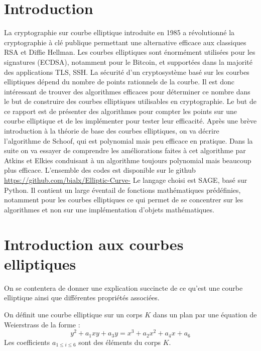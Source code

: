 \documentclass[12pt]{article}
\begin{document}
\section{Introduction}
La cryptographie sur courbe elliptique introduite en 1985 a révolutionné la cryptographie à clé publique permettant une alternative efficace aux classiques RSA et Diffie Hellman. Les courbes elliptiques sont énormément utilisées pour les signatures (ECDSA), notamment pour le Bitcoin, et supportées dans la majorité des applications TLS, SSH. La sécurité d'un cryptosystème basé sur les courbes elliptiques dépend du nombre de points rationnels de la courbe. Il est donc intéressant de trouver des algorithmes efficaces pour déterminer ce nombre dans le but de construire des courbes elliptiques utilisables en cryptographie.
\newline
Le but de ce rapport est de présenter des algorithmes pour compter les points sur une courbe elliptique et de les implémenter pour tester leur efficacité. Après une brève introduction à la théorie de base des courbes elliptiques, on va décrire l'algorithme de Schoof, qui est polynomial mais peu efficace en pratique. Dans la suite on va essayer de comprendre les améliorations faites à cet algorithme par Atkins et Elkies conduisant à un algorithme toujours polynomial mais beaucoup plus efficace.
\newline
L'ensemble des codes est disponible sur le github \url{https://github.com/bialx/Elliptic-Curve-} Le langage choisi est SAGE, basé sur Python. Il contient un large éventail de fonctions mathématiques prédéfinies, notamment pour les courbes elliptiques ce qui permet de se concentrer sur les algorithmes et non sur une implémentation d'objets mathématiques.
\section{Introduction aux courbes elliptiques}
 On se contentera de donner une explication succincte de ce qu'est une courbe elliptique ainsi que différentes propriétés associées.

\begin{defi}
On définit une courbe elliptique sur un corps $K$ dans un plan par une équation de Weierstrass de la forme : 
\begin{equation*}
y^2 + a_1xy + a_3y  = x^3 + a_2x^2 + a_4x + a_6
\end{equation*}
Les coefficients $a_{1 \leq i \leq 6}$ sont des éléments du corps $K$.
\end{defi}
\end{document}
